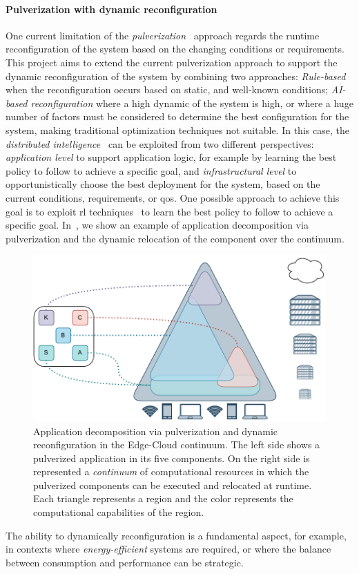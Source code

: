 \documentclass[12pt,a4paper]{article}
\begin{document}
\paragraph{Pulverization with dynamic reconfiguration}\label{sec:pulv-dyn}
One current limitation of the \emph{pulverization}~\cite{DBLP:journals/fi/CasadeiPPVW20} approach regards the runtime reconfiguration of the system based on the changing conditions or requirements.
%
This project aims to extend the current pulverization approach to support the dynamic reconfiguration of the system
by combining two approaches:
\emph{Rule-based} when the reconfiguration occurs based on static, and well-known conditions;
\emph{AI-based reconfiguration} where a high dynamic of the system is high,
or where a huge number of factors must be considered to determine the best configuration for the system,
making traditional optimization techniques not suitable.
%
In this case,
the \emph{distributed intelligence}~\cite{DBLP:journals/access/CampoloIM23} can be exploited from two different perspectives:
\emph{application level} to support application logic,
for example by learning the best policy to follow to achieve a specific goal,
and \emph{infrastructural level} to opportunistically choose the best deployment for the system,
based on the current conditions, requirements, or \ac{qos}.
%
One possible approach to achieve this goal is to exploit \ac{rl} techniques~\cite{DBLP:journals/computing/ShahidaniGHK23} to learn the best policy to follow to achieve a specific goal.
%
In~,
we show an example of application decomposition via pulverization and the dynamic relocation of the component over the continuum.
%
\begin{figure}[ht]
	\centering
	\includegraphics[width=0.6\linewidth]{img/phd-proposal.drawio.pdf}
	\caption{
		Application decomposition via pulverization and dynamic reconfiguration in the Edge-Cloud continuum.
		The left side shows a pulverized application in its five components.
		On the right side is represented a \emph{continuum} of computational resources in which the pulverized components can be executed and relocated at runtime.
		Each triangle represents a region and the color represents the computational capabilities of the region. 
		}
	\label{fig:ai-reconf}
\end{figure}
%
The ability to dynamically reconfiguration is a fundamental aspect,
for example,
in contexts where \emph{energy-efficient} systems are required,
or where the balance between consumption and performance can be strategic.
\end{document}
